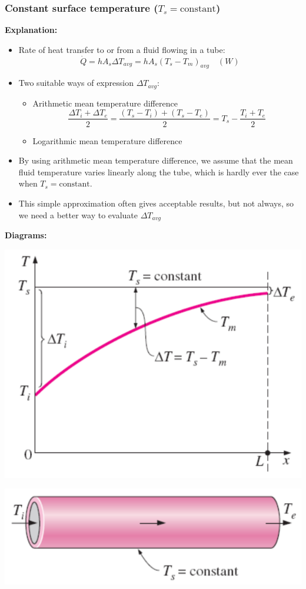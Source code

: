\documentclass[11pt]{article}
\begin{document}
\subsubsection{Constant surface temperature (\(T_s = \text{constant}\))}
\label{sec:org40b9a87}
\textbf{Explanation:}
\begin{itemize}
\item Rate of heat transfer to or from a fluid flowing in a tube:
\[\dot{Q} = hA_s \Delta T_{avg} = hA_s (T_s - T_m)_{avg} \quad (\unit{W})\]
\item Two suitable ways of expression \(\Delta T_{avg}\):
\begin{itemize}
\item Arithmetic mean temperature difference
\[\frac{\Delta T_i + \Delta T_e}{2} = \frac{(T_s - T_i) + (T_s - T_e)}{2} = T_s - \frac{T_i + T_e}{2}\]
\item Logarithmic mean temperature difference
\end{itemize}
\item By using arithmetic mean temperature difference, we assume that the mean fluid temperature varies linearly along the tube, which is hardly ever the case when \(T_s = \text{constant}\).
\item This simple approximation often gives acceptable results, but not always, so we need a better way to evaluate \(\Delta T_{avg}\)
\end{itemize}

 \newpage

\textbf{Diagrams:}
\begin{center}
\includegraphics[width=.9\linewidth]{./images/constant-surface-temperature-graph.png}
\end{center}
\begin{center}
\includegraphics[width=.9\linewidth]{./images/constant-surface-temperature-diagram.png}
\end{center}
\end{document}
